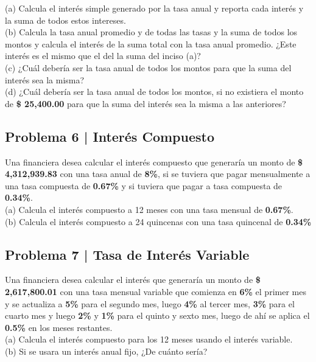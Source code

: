 \documentclass{article}
\begin{document}
\noindent
(a) Calcula el interés simple generado por la tasa anual y reporta cada interés y la suma de todos estos intereses. 
\\[6pt]
(b) Calcula la tasa anual promedio y de todas las tasas y la suma de todos los montos y calcula el interés de la suma total con la tasa anual promedio. ¿Este interés es el mismo que el del la suma del inciso (a)?
\\[6pt]
(c) ¿Cuál debería ser la tasa anual de todos los montos para que la suma del interés sea la misma?
\\[6pt]
(d) ¿Cuál debería ser la tasa anual de todos los montos, si no existiera el monto de \textbf{\$ 25,400.00} para que la suma del interés sea la misma a las anteriores?

\subsection*{Problema 6 | Interés Compuesto}

Una financiera desea calcular el interés compuesto que generaría un monto de \textbf{\$ 4,312,939.83} con una tasa anual de \textbf{8\%}, si se tuviera que pagar mensualmente a una tasa compuesta de \textbf{0.67\%} y si tuviera que pagar a tasa compuesta de \textbf{0.34\%}.
\\[12pt]
(a) Calcula el interés compuesto a 12 meses con una tasa mensual de \textbf{0.67\%}. 
\\[6pt]
(b) Calcula el interés compuesto a 24 quincenas con una tasa quincenal de \textbf{0.34\%}

\clearpage

\subsection*{Problema 7 | Tasa de Interés Variable}

Una financiera desea calcular el interés que generaría un monto de \textbf{\$ 2,617,800.01} con una tasa mensual variable que comienza en \textbf{6\%} el primer mes y se actualiza a \textbf{5\%} para el segundo mes, luego \textbf{4\%} al tercer mes, \textbf{3\%} para el cuarto mes y luego \textbf{2\%} y \textbf{1\%} para el quinto y sexto mes, luego de ahí se aplica el \textbf{0.5\%} en los meses restantes.
\\[12pt]
(a) Calcula el interés compuesto para los 12 meses usando el interés variable. 
\\[6pt]
(b) Si se usara un interés anual fijo, ¿De cuánto sería?
\end{document}
